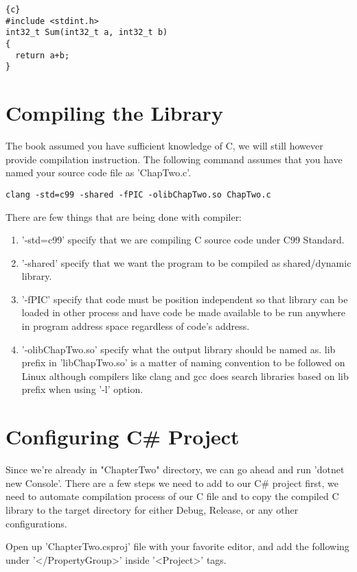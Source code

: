 \begin{lstlisting}{c}
#include <stdint.h>
int32_t Sum(int32_t a, int32_t b)
{
  return a+b;
}
\end{lstlisting}

\section{Compiling the Library}
The book assumed you have sufficient knowledge of C, we will still however provide compilation instruction. The following command assumes that you have named your source code file as 'ChapTwo.c'.

\begin{lstlisting}
clang -std=c99 -shared -fPIC -olibChapTwo.so ChapTwo.c
\end{lstlisting}

There are few things that are being done with compiler:

\begin{enumerate}
	\item '-std=c99' specify that we are compiling C source code under C99 Standard.
	\item '-shared' specify that we want the program to be compiled as shared/dynamic library.
	\item '-fPIC' specify that code must be position independent so that library can be loaded in other process and have code be made available to be run anywhere in program address space regardless of code's address.
	\item '-olibChapTwo.so' specify what the output library should be named as. lib prefix in 'libChapTwo.so' is a matter of naming convention to be followed on Linux although compilers like clang and gcc does search libraries based on lib prefix when using '-l' option. 
\end{enumerate}
\newpage
\section{Configuring C\# Project}
Since we're already in "ChapterTwo" directory, we can go ahead and run 'dotnet new Console'. There are a few steps we need to add to our C\# project first, we need to automate compilation process of our C file and to copy the compiled C library to the target directory for either Debug, Release, or any other configurations.

Open up 'ChapterTwo.csproj' file with your favorite editor, and add the following under '</PropertyGroup>' inside '<Project>' tags.


